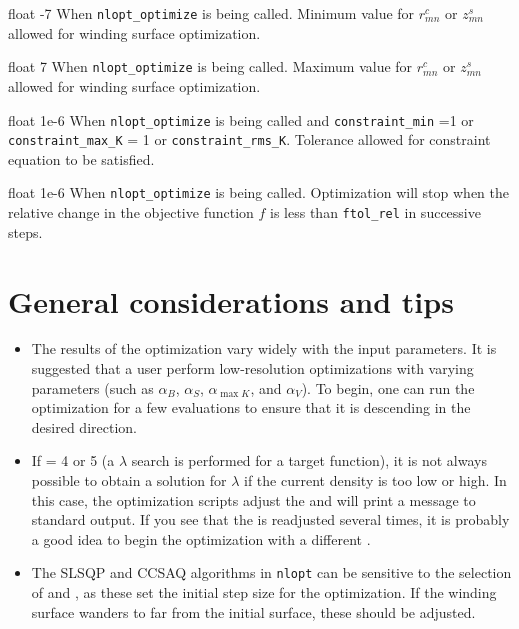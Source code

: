 \myhrule

{float}
{-7}
{When \texttt{nlopt\_optimize} is being called. }
{Minimum value for $r_{mn}^c$ or $z_{mn}^s$ allowed for winding surface optimization.}

\myhrule

{float}
{7}
{When \texttt{nlopt\_optimize} is being called. }
{Maximum value for $r_{mn}^c$ or $z_{mn}^s$ allowed for winding surface optimization.}

\myhrule

{float}
{1e-6}
{When \texttt{nlopt\_optimize} is being called and \texttt{constraint\_min} =1 or \texttt{constraint\_max\_K} = 1 or \texttt{constraint\_rms\_K}.}
{Tolerance allowed for constraint equation to be satisfied.}

\myhrule

{float}
{1e-6}
{When \texttt{nlopt\_optimize} is being called.}
{Optimization will stop when the relative change in the objective function $f$ is less than \texttt{ftol\_rel} in successive steps.}

\myhrule

\section{General considerations and tips}
\begin{itemize}
\item The results of the optimization vary widely with the input parameters. It is suggested that a user perform low-resolution optimizations with varying parameters (such as $\alpha_B$, $\alpha_S$, $\alpha_{\max{K}}$, and $\alpha_V$). To begin, one can run the optimization for a few evaluations to ensure that it is descending in the desired direction. 
\item If  = 4 or 5 (a $\lambda$ search is performed for a target function), it is not always possible to obtain a solution for $\lambda$ if the current density is too low or high. In this case, the optimization scripts adjust the  and will print a message to standard output. If you see that the  is readjusted several times, it is probably a good idea to begin the optimization with a different  . 
\item The SLSQP and CCSAQ algorithms in \texttt{nlopt} can be sensitive to the selection of  and , as these set the initial step size for the optimization. If the winding surface wanders to far from the initial surface, these should be adjusted. 
\end{itemize}
